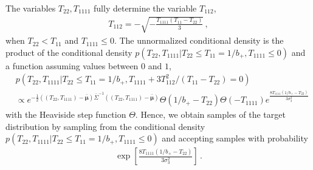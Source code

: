 \documentclass[a4paper, 11pt]{article}
\begin{document}
 The variables $T_{22},T_{1111}$ fully determine the variable $T_{112}$,
\begin{align}
T_{112}= -\sqrt{-\frac{T_{1111}(T_{11}-T_{22})}{3}}\,,
\end{align}
when $T_{22} < T_{11}$ and $T_{1111}\leq 0$.  The unnormalized conditional density is the product of the conditional density $p(T_{22},T_{1111}|T_{22}\leq T_{11}=1/b_+,T_{1111}\leq 0)$ and a function assuming values between $0$ and $1$,
\begin{align}
&p(T_{22},T_{1111}|T_{22}\leq T_{11}=1/b_+, T_{1111}+3T_{112}^2/(T_{11}-T_{22}) =0)\\
& \propto e^{-\frac{1}{2}((T_{22},T_{1111})-\bar{\bm{\mu}})\bar{\Sigma}^{-1}((T_{22},T_{1111})-\bar{\bm{\mu}}) }\Theta(1/b_+-T_{22})\Theta(-T_{1111})e^{ \frac{8T_{1111} (1/b_+ - T_{22})}{3 \sigma_3^2}}
\end{align}
with the Heaviside step function $\Theta$. Hence, we obtain samples of the target distribution by sampling from the conditional density $p(T_{22},T_{1111}|T_{22}\leq T_{11}=1/b_+,T_{1111}\leq 0)$ and accepting samples with probability 
\begin{align}
\exp\left[ \frac{8T_{1111} (1/b_+ - T_{22})}{3 \sigma_3^2}\right]\,.
\end{align}


\end{document}

